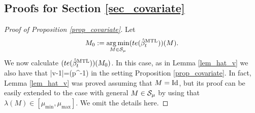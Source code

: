 \subsection{Proofs for Section \ref{sec_covariate}}\label{app_covariate}

\begin{proof}[Proof of Proposition \ref{prop_covariate}]
Let 
$$M_0:=\argmin_{M\in \cal S_{\mu}}(\te(\hat{\beta}_t^{\MTL}))(M).$$ 
We now calculate $(\te(\hat{\beta}_t^{\MTL}))(M_0)$. In this case, as in Lemma \ref{lem_hat_v} we also have that 
\be\label{hatvM}|\hat v-1|=\OO(p^{-1}) \ee 
in the setting Proposition \ref{prop_covariate}. In fact, Lemma \ref{lem_hat_v} was proved assuming that $M=\id$, but its proof can be easily extended to the case with general $M\in \cal S_{\mu}$ by using that $\lambda(M)\in [\mu_{\min},\mu_{\max}]$. We omit the details here. 


\end{proof}
